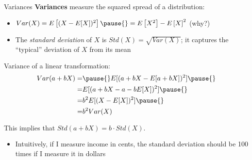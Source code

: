 \documentclass[11pt,english,handout]{beamer}
\begin{document}
\begin{frame}{Variances}
\vspace{0.2cm}
\textbf{Variances} measure the squared spread of a distribution: 

\begin{itemize}
\item $Var(X)=E\left[(X-E[X])^2\right]\pause{}=E\left[X^2\right]-E\left[X\right]^2$ (why?)
\vspace{0.1cm}\pause{}
\item The \emph{standard deviation} of $X$ is $Std(X)=\sqrt{Var(X)}$; it captures the ``typical'' deviation of $X$ from its mean
\end{itemize}
\vspace{0.2cm}
\pause{}

Variance of a linear transformation: 
\begin{align*}
Var(a+bX)=&\pause{}E[(a+bX-E[a+bX])^2]\pause{} \\
 = &E[(a+bX-a-bE[X])^2]\pause{} \\
= & b^2 E[(X-E[X])^2]\pause{} \\
 =& b^2Var(X)
\end{align*}

\pause{}
This implies that $Std(a + bX) = b \cdot Std(X)$.
	\begin{itemize}
		\item 
		Intuitively, if I measure income in cents, the standard deviation should be 100 times if I measure it in dollars
	\end{itemize}

\end{frame}
\end{document}

